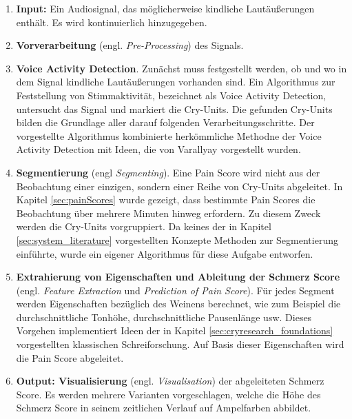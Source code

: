 \begin{enumerate}[leftmargin=*]
	\item \textbf{Input: } Ein Audiosignal, das möglicherweise kindliche Lautäußerungen enthält. Es wird kontinuierlich hinzugegeben.
	
	\item \textbf{Vorverarbeitung} (engl. \emph{Pre-Processing}) des Signals.
	
	\item \textbf{Voice Activity Detection}. Zunächst muss festgestellt werden, ob und wo in dem Signal kindliche Lautäußerungen vorhanden sind. Ein Algorithmus zur Feststellung von Stimmaktivität, bezeichnet als Voice Activity Detection, untersucht das Signal und markiert die Cry-Units. Die gefunden Cry-Units bilden die Grundlage aller darauf folgenden Verarbeitungsschritte. Der vorgestellte Algorithmus kombinierte herkömmliche Methodne der Voice Activity Detection mit Ideen, die von Varallyay \cite{cry_thesis} vorgestellt wurden.
	
	\item \textbf{Segmentierung} (engl \emph{Segmenting}). Eine Pain Score wird nicht aus der Beobachtung einer einzigen, sondern einer Reihe von Cry-Units abgeleitet. In Kapitel \ref{sec:painScores} wurde gezeigt, dass bestimmte Pain Scores die Beobachtung über mehrere Minuten hinweg erfordern. Zu diesem Zweck werden die Cry-Units vorgruppiert. Da keines der in Kapitel \ref{sec:system_literature} vorgestellten Konzepte Methoden zur Segmentierung einführte, wurde ein eigener Algorithmus für diese Aufgabe entworfen.
	
	\item \textbf{Extrahierung von Eigenschaften und Ableitung der Schmerz Score} (engl. \emph{Feature Extraction} und \emph{Prediction of Pain Score}). Für jedes Segment werden Eigenschaften bezüglich des Weinens berechnet, wie zum Beispiel die durchschnittliche Tonhöhe, durchschnittliche Pausenlänge usw. Dieses Vorgehen implementiert Ideen der in Kapitel \ref{sec:cryresearch_foundations} vorgestellten klassischen Schreiforschung. Auf Basis dieser Eigenschaften wird die Pain Score abgeleitet.
	
	\item \textbf{Output: Visualisierung} (engl. \emph{Visualisation}) der abgeleiteten Schmerz Score. Es werden mehrere Varianten vorgeschlagen, welche die Höhe des Schmerz Score in seinem zeitlichen Verlauf auf Ampelfarben abbildet.
\end{enumerate}

